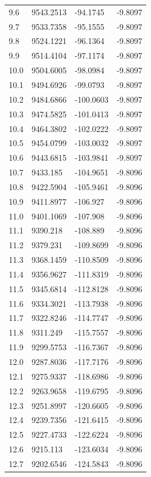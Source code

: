 \begin{table}[H]
\begin{tabular}{llll}
9.6 & 9543.2513 & -94.1745 & -9.8097 \\
9.7 & 9533.7358 & -95.1555 & -9.8097 \\
9.8 & 9524.1221 & -96.1364 & -9.8097 \\
9.9 & 9514.4104 & -97.1174 & -9.8097 \\
10.0 & 9504.6005 & -98.0984 & -9.8097 \\
10.1 & 9494.6926 & -99.0793 & -9.8097 \\
10.2 & 9484.6866 & -100.0603 & -9.8097 \\
10.3 & 9474.5825 & -101.0413 & -9.8097 \\
10.4 & 9464.3802 & -102.0222 & -9.8097 \\
10.5 & 9454.0799 & -103.0032 & -9.8097 \\
10.6 & 9443.6815 & -103.9841 & -9.8097 \\
10.7 & 9433.185 & -104.9651 & -9.8096 \\
10.8 & 9422.5904 & -105.9461 & -9.8096 \\
10.9 & 9411.8977 & -106.927 & -9.8096 \\
11.0 & 9401.1069 & -107.908 & -9.8096 \\
11.1 & 9390.218 & -108.889 & -9.8096 \\
11.2 & 9379.231 & -109.8699 & -9.8096 \\
11.3 & 9368.1459 & -110.8509 & -9.8096 \\
11.4 & 9356.9627 & -111.8319 & -9.8096 \\
11.5 & 9345.6814 & -112.8128 & -9.8096 \\
11.6 & 9334.3021 & -113.7938 & -9.8096 \\
11.7 & 9322.8246 & -114.7747 & -9.8096 \\
11.8 & 9311.249 & -115.7557 & -9.8096 \\
11.9 & 9299.5753 & -116.7367 & -9.8096 \\
12.0 & 9287.8036 & -117.7176 & -9.8096 \\
12.1 & 9275.9337 & -118.6986 & -9.8096 \\
12.2 & 9263.9658 & -119.6795 & -9.8096 \\
12.3 & 9251.8997 & -120.6605 & -9.8096 \\
12.4 & 9239.7356 & -121.6415 & -9.8096 \\
12.5 & 9227.4733 & -122.6224 & -9.8096 \\
12.6 & 9215.113 & -123.6034 & -9.8096 \\
12.7 & 9202.6546 & -124.5843 & -9.8096 \\

\end{tabular}
\end{table}
